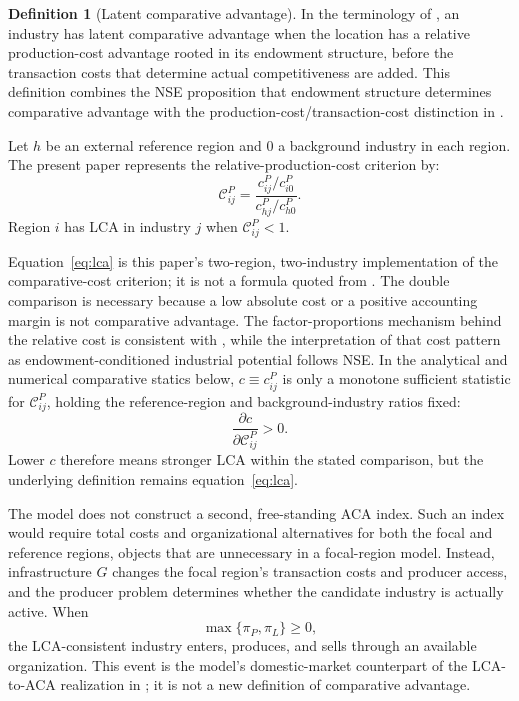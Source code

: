 \documentclass[11pt]{article}
\theoremstyle{definition}
\newtheorem{definition}{Definition}
\theoremstyle{remark}
\begin{document}
\begin{definition}[Latent comparative advantage]
In the terminology of \citet{LinWang2023}, an industry has
latent comparative advantage when the location has a relative production-cost
advantage rooted in its endowment structure, before the transaction costs
that determine actual competitiveness are added.  This definition combines
the NSE proposition that endowment structure determines comparative advantage
\citep{Lin2011,Lin2012,JuLinWang2015} with the production-cost/transaction-cost
distinction in \citet{LinWang2023}.

Let \(h\) be an external reference region and \(0\) a background industry in
each region.  The present paper represents the relative-production-cost
criterion by:
\begin{equation}
 \mathcal C^P_{ij}
 =
 \frac{c^P_{ij}/c^P_{i0}}
 {c^P_{hj}/c^P_{h0}}.
 \label{eq:lca}
\end{equation}
Region \(i\) has LCA in industry \(j\) when
\(\mathcal C^P_{ij}<1\).
\end{definition}

Equation~\eqref{eq:lca} is this paper's two-region, two-industry
implementation of the comparative-cost criterion; it is not a formula quoted
from \citet{LinWang2023}.  The double comparison is necessary because a low
absolute cost or a positive accounting margin is not comparative advantage.
The factor-proportions mechanism behind the relative cost is consistent with
\citet{Romalis2004}, while the interpretation of that cost pattern as
endowment-conditioned industrial potential follows NSE.  In the analytical
and numerical comparative statics below,
\(c\equiv c^P_{ij}\) is only a monotone sufficient statistic for
\(\mathcal C^P_{ij}\), holding the reference-region and
background-industry ratios fixed:
\begin{equation}
 \frac{\partial c}{\partial\mathcal C^P_{ij}}>0.
 \label{eq:cost_lca_mapping}
\end{equation}
Lower \(c\) therefore means stronger LCA within the stated comparison, but the
underlying definition remains equation~\eqref{eq:lca}.

The model does not construct a second, free-standing ACA index.  Such an index
would require total costs and organizational alternatives for both the focal
and reference regions, objects that are unnecessary in a focal-region model.
Instead, infrastructure \(G\) changes the focal region's transaction costs and
producer access, and the producer problem determines whether the candidate
industry is actually active.  When
\[
\max\{\pi_P,\pi_L\}\geq0,
\]
the LCA-consistent industry enters, produces, and sells through an available
organization.  This event is the model's domestic-market counterpart of the
LCA-to-ACA realization in \citet{LinWang2023}; it is not a new definition of
comparative advantage.
\end{document}
